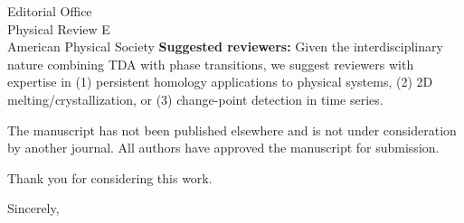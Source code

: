 \documentclass[11pt]{letter}
\begin{document}
\begin{letter}{Editorial Office\\Physical Review E\\American Physical Society}
\textbf{Suggested reviewers:} Given the interdisciplinary nature combining TDA with phase transitions, we suggest reviewers with expertise in (1) persistent homology applications to physical systems, (2) 2D melting/crystallization, or (3) change-point detection in time series.

The manuscript has not been published elsewhere and is not under consideration by another journal. All authors have approved the manuscript for submission.

Thank you for considering this work.

\closing{Sincerely,}

\end{letter}
\end{document}

